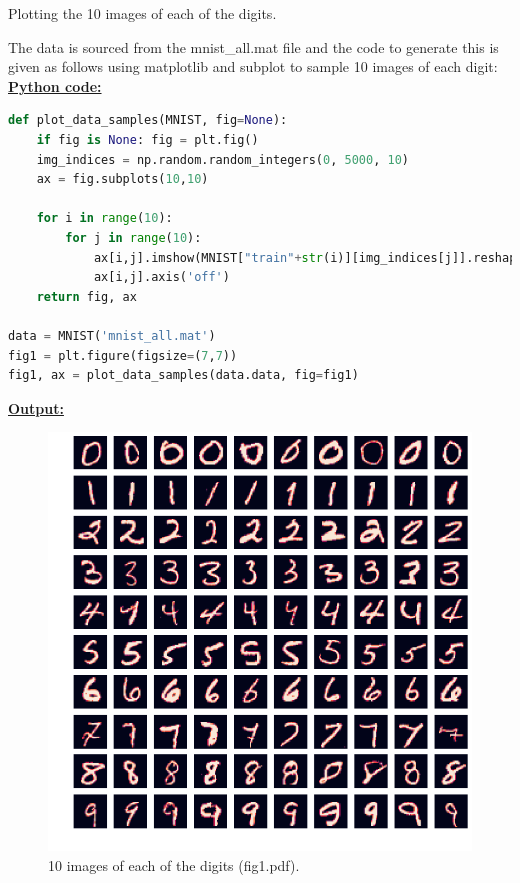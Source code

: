 \documentclass{article}
\begin{document}
\begin{biomathg}
Plotting  the 10 images of each of the digits.
\end{biomathg}
\vspace{0.5cm}


\noindent The data is sourced from the mnist\_all.mat  file and the code to generate this is given as follows using matplotlib and subplot to  sample 10 images of each digit: \\

\noindent \underline{\textbf{Python code:}} \\
\begin{biomathy}
\begin{lstlisting}[language=python]
def plot_data_samples(MNIST, fig=None):
    if fig is None: fig = plt.fig()
    img_indices = np.random.random_integers(0, 5000, 10)
    ax = fig.subplots(10,10)

    for i in range(10):
        for j in range(10):
            ax[i,j].imshow(MNIST["train"+str(i)][img_indices[j]].reshape((28,28)))
            ax[i,j].axis('off')
    return fig, ax

data = MNIST('mnist_all.mat')
fig1 = plt.figure(figsize=(7,7))
fig1, ax = plot_data_samples(data.data, fig=fig1)
\end{lstlisting}
\end{biomathy}

\pagebreak
\noindent \underline{\textbf{Output:}} \\


\begin{figure}[H]
        \centering
        \includegraphics{fig1.pdf}
        \caption{10 images of each of the digits (fig1.pdf).}
        \label{fig1}
\end{figure}
\end{document}
